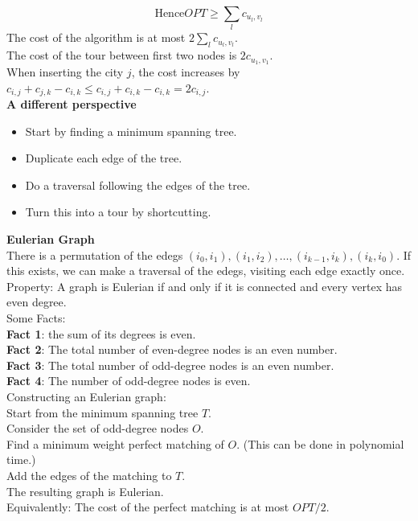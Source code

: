 \documentclass[onecolumn]{report}
\begin{document}
\begin{equation*}
    \text{Hence} OPT \geq \sum_l c_{u_l,v_l}
\end{equation*}
The cost of the algorithm is at most $2 \sum_l c_{u_l,v_l}$.\\
The cost of the tour between first two nodes is $2c_{u_1,v_1}$.\\
When inserting the city $j$, the cost increases by $c_{i,j}+c_{j,k}-c_{i,k} \leq c_{i,j}+c_{i,k}-c_{i,k} = 2c_{i,j}$.\\
\textbf{A different perspective}
\begin{itemize}
    \item Start by finding a minimum spanning tree.
    \item Duplicate each edge of the tree.
    \item Do a traversal following the edges of the tree.
    \item Turn this into a tour by shortcutting.
\end{itemize}

\indent \textbf{Eulerian Graph}\\
\indent There is a permutation of the edegs $(i_0,i_1),(i_1,i_2),\dots,(i_{k-1},i_k),(i_k,i_0)$. If this exists, we can make a traversal of the edegs, visiting each edge exactly once.\\
\indent Property: A graph is Eulerian if and only if it is connected and every vertex has even degree.\\
Some Facts:\\
\indent \textbf{Fact 1}: the sum of its degrees is even.\\
\indent \textbf{Fact 2}: The total number of even-degree nodes is an even number.\\
\indent \textbf{Fact 3}: The total number of odd-degree nodes is an even number.\\
\indent \textbf{Fact 4}: The number of odd-degree nodes is even.\\
Constructing an Eulerian graph:\\
\indent Start from the minimum spanning tree $T$.\\
\indent Consider the set of odd-degree nodes $O$.\\
\indent Find a minimum weight perfect matching of $O$. (This can be done in polynomial time.)\\
\indent Add the edges of the matching to $T$.\\
\indent The resulting graph is Eulerian.\\
Equivalently: The cost of the perfect matching is at most $OPT/2$.\\
\end{document}
